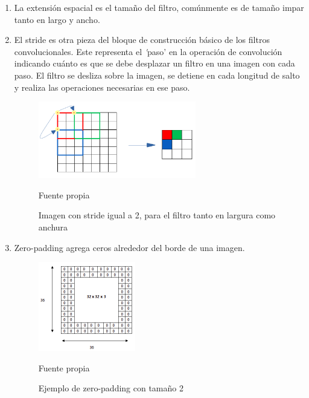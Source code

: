 		\begin{enumerate}
			\item La extensión espacial es el tamaño del filtro, comúnmente es de tamaño impar tanto en largo y ancho.
			
			\item El stride es otra pieza del bloque de construcción básico de los filtros convolucionales. Este representa el {\textit 'paso'} en la operación de convolución indicando cuánto es que se debe desplazar un filtro en una imagen con cada paso. El filtro se desliza sobre la imagen, se detiene en cada longitud de salto y realiza las operaciones necesarias en ese paso.

				\begin{figure}[H]
				\begin{center}
				\includegraphics[width=0.65\textwidth]{images/marcoteorico/stride}
				\end{center}
				\begin{center}
				\caption{\small{Imagen con stride igual a 2, para el filtro tanto en largura como anchura}}
				\vspace{-0.5em}
				{\small{Fuente propia}}
				\end{center}
				\vspace{-1.9em}
				\end{figure}
			\item Zero-padding agrega ceros alrededor del borde de una imagen.
				\begin{figure}[H]
				\begin{center}
				\includegraphics[width=0.4\textwidth]{images/marcoteorico/PAD2}
				\end{center}
				\begin{center}
				\caption{\small{Ejemplo de zero-padding con tamaño 2}}
				\vspace{-0.5em}
				{\small{Fuente propia}}
				\end{center}
				\vspace{-1.9em}
				\end{figure}


\end{enumerate}
